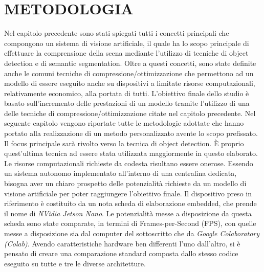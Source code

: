 
\chapter{METODOLOGIA}
\label{Capitolo3}
\thispagestyle{empty}

Nel capitolo precedente sono stati spiegati tutti i concetti principali che 
compongono un sistema di visione artificiale, il quale ha lo scopo principale 
di effettuare la comprensione della scena mediante l'utilizzo di tecniche di 
object detection e di semantic segmentation. Oltre a questi concetti, sono 
state definite anche le comuni tecniche di compressione/ottimizzazione che 
permettono ad un modello di essere eseguito anche su dispositivi a limitate 
risorse computazionali, relativamente economico, alla portata di tutti. 
L'obiettivo finale dello studio è basato sull'incremento delle prestazioni di 
un modello tramite l'utilizzo di una delle tecniche di compressione/ottimizzazione 
citate nel capitolo precedente. Nel seguente capitolo vengono 
riportate tutte le metodologie adottate che hanno portato alla realizzazione 
di un metodo personalizzato avente lo scopo prefissato. Il focus principale 
sarà rivolto verso la tecnica di object detection. È proprio quest'ultima 
tecnica ad essere stata utilizzata maggiormente in questo elaborato. Le
risorse computazionali richieste da codesta risultano essere onerose. Essendo 
un sistema autonomo implementato all'interno di una centralina dedicata, 
bisogna aver un chiaro prospetto delle potenzialità richieste da un modello di 
visione artificiale per poter raggiungere l'obiettivo finale. Il dispositivo preso 
in riferimento è costituito da un nota scheda di elaborazione embedded, che 
prende il nome di \emph{NVidia Jetson Nano}. Le potenzialità messe a disposizione 
da questa scheda sono state comparate, in termini di Frames-per-Second 
(FPS), con quelle messe a disposizione sia dal computer del sottoscritto 
che da \emph{Google Colaboratory (Colab)}. Avendo caratteristiche hardware ben 
differenti l'uno dall'altro, si è pensato di creare una comparazione standard 
composta dallo stesso codice eseguito su tutte e tre le diverse architetture. 
